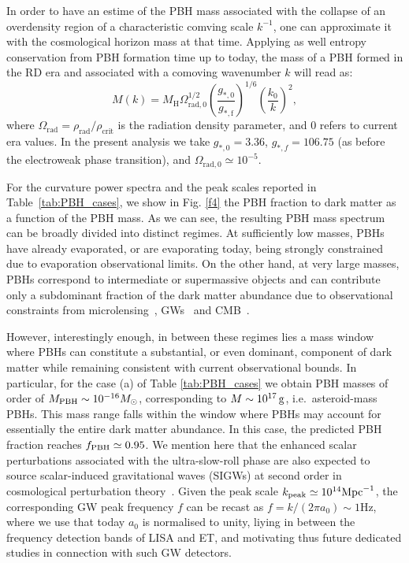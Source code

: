 \documentclass[nofootinbib,aps,a4paper,letterpaper,superscriptaddress,
twocolumn,times]{revtex4}
\renewcommand{\(}{\left(}
\renewcommand{\)}{\right)}
\renewcommand{\(}{\left(}
\renewcommand{\)}{\right)}
\renewcommand{\[}{\left[}
\renewcommand{\]}{\right]}
\begin{document}
In order to have an estime of the PBH mass associated with the collapse of an overdensity region of a characteristic comving scale $k^{-1}$, one can approximate it with the cosmological horizon mass at that time. Applying
as well entropy conservation from PBH formation time up to today, the mass of a PBH formed in the RD era and associated with a comoving wavenumber $k$ will read as:
\begin{equation}\label{MKdef}
M(k) = M_\mathrm{H}\Omega^{1/2}_\mathrm{rad,0}\left(\frac{g_{*,0}}{g_\mathrm{*,f}}\right)^{1/6}\left(\frac{k_0}{k}\right)^2,
\end{equation}
where $\Omega_\mathrm{rad}=\rho_\mathrm{rad}/\rho_\mathrm{crit}$ is the radiation density parameter, and $0$ refers to current era values.
In the present analysis we take $g_{*,0} = 3.36$, $g_{*,f} = 106.75$ (as before the electroweak phase transition), and $\Omega_\mathrm{rad,0}\simeq 10^{-5}$.

For the curvature power spectra and the peak scales reported in 
Table~\ref{tab:PBH_cases}, we show in Fig. \ref{f4}
the PBH fraction to dark matter as a function of the PBH mass. As we can see, the resulting PBH 
mass spectrum can be broadly divided into distinct 
regimes. At sufficiently low masses, PBHs have already evaporated, or are 
evaporating today, being strongly constrained due to evaporation observational limits. On the other hand, at very large 
masses, PBHs correspond to intermediate or supermassive objects and can 
contribute only a subdominant fraction of the dark matter abundance due to 
observational constraints from microlensing~\cite{Niikura:2017zjd}, GWs~\cite{Sasaki:2016jop,Andres-Carcasona:202405732} and CMB~\cite{Ali-Haimoud:2016mbv}.

However, interestingly enough,
in between these regimes lies a mass window where PBHs can constitute a 
substantial, or even dominant, component of dark matter while remaining 
consistent with current observational bounds. In particular, for the case (a)  of Table  \ref{tab:PBH_cases} we 
obtain PBH masses of order of $M_{\rm PBH} \sim 10^{-16}M_\odot$, corresponding to 
$M \sim  10^{17}\,{\rm g}$, i.e.\ asteroid-mass PBHs. This mass range 
falls within the window where PBHs may account for essentially the entire dark 
matter abundance. In this case, the predicted PBH fraction reaches $f_{\rm 
PBH}\simeq 0.95$.
We mention here that the enhanced scalar perturbations associated with the 
ultra-slow-roll phase are also expected to source scalar-induced gravitational 
waves (SIGWs) at second order in cosmological perturbation theory~\cite{Domenech:2024drm,Domenech:2025zvi}. Given the peak scale $k_{\rm peak}\simeq10^{14}\mathrm{Mpc}^{-1}   $, the corresponding GW peak frequency $f$ can be recast as $f = k/(2\pi a_0) \sim 1\mathrm{Hz}$, where we use that today $a_0$ is normalised to unity, liying  in between the frequency detection bands of LISA and ET,
and motivating thus future dedicated studies in connection with such GW detectors.
\end{document}

